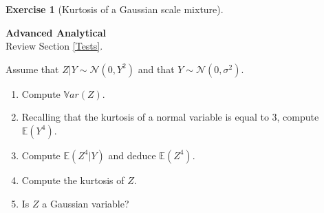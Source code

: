 \documentclass[
  11pt,
]{book}
\theoremstyle{definition}
\theoremstyle{definition}
\theoremstyle{definition}
\newtheorem{exercise}{Exercise}[chapter]
\theoremstyle{definition}
\theoremstyle{remark}
\begin{document}
\begin{exercisebox}

\begin{exercise}[Kurtosis of a Gaussian scale mixture]
\protect\hypertarget{exr:tests-kurtosis-mixture}{}\label{exr:tests-kurtosis-mixture}

\textbf{Advanced \textbar{} Analytical}\\
Review Section \ref{Tests}.

Assume that \(Z|Y \sim \mathcal{N}(0, Y^2)\) and that \(Y \sim \mathcal{N}(0, \sigma^2)\).

\begin{enumerate}
\def\labelenumi{\arabic{enumi}.}
\item
  Compute \(\mathbb{V}ar(Z)\).
\item
  Recalling that the kurtosis of a normal variable is equal to 3, compute \(\mathbb{E}(Y^4)\).
\item
  Compute \(\mathbb{E}(Z^4 | Y)\) and deduce \(\mathbb{E}(Z^4)\).
\item
  Compute the kurtosis of \(Z\).
\item
  Is \(Z\) a Gaussian variable?
\end{enumerate}

\end{exercise}

\end{exercisebox}

\end{document}
